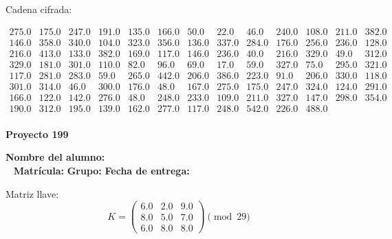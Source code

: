 \documentclass[12pt]{article}
\begin{document}
Cadena cifrada:
\begin{center}
$\begin{array}{lllllllllllll}
275.0 & 175.0 & 247.0 & 191.0 & 135.0 & 166.0 & 50.0 & 22.0 & 46.0 & 240.0 & 108.0 & 211.0 & 382.0\\
146.0 & 358.0 & 340.0 & 104.0 & 323.0 & 356.0 & 136.0 & 337.0 & 284.0 & 176.0 & 256.0 & 236.0 & 128.0\\
216.0 & 413.0 & 133.0 & 382.0 & 169.0 & 117.0 & 146.0 & 236.0 & 40.0 & 216.0 & 329.0 & 49.0 & 312.0\\
329.0 & 181.0 & 301.0 & 110.0 & 82.0 & 96.0 & 69.0 & 17.0 & 59.0 & 327.0 & 75.0 & 295.0 & 321.0\\
117.0 & 281.0 & 283.0 & 59.0 & 265.0 & 442.0 & 206.0 & 386.0 & 223.0 & 91.0 & 206.0 & 330.0 & 118.0\\
301.0 & 314.0 & 46.0 & 300.0 & 176.0 & 48.0 & 167.0 & 275.0 & 175.0 & 247.0 & 324.0 & 124.0 & 291.0\\
166.0 & 122.0 & 142.0 & 276.0 & 48.0 & 248.0 & 233.0 & 109.0 & 211.0 & 327.0 & 147.0 & 298.0 & 354.0\\
190.0 & 312.0 & 195.0 & 139.0 & 162.0 & 277.0 & 117.0 & 248.0 & 542.0 & 226.0 & 488.0\\
\end{array}$
\end{center}

\newpage


\textbf{Proyecto 199}

\textbf{Nombre del alumno:} \underline{\hspace{13cm}}\\\
\vspace{1cm}
\textbf{Matrícula:} \underline{\hspace{4cm}} \hspace{1cm}
\textbf{Grupo:} \underline{\hspace{2cm}}
\textbf{Fecha de entrega:} \underline{\hspace{2cm}}

\medskip

Matriz llave:
\[
K = \begin{pmatrix}
6.0 & 2.0 & 9.0\\
8.0 & 5.0 & 7.0\\
6.0 & 8.0 & 8.0
\end{pmatrix} \pmod{29}
\]
\end{document}
